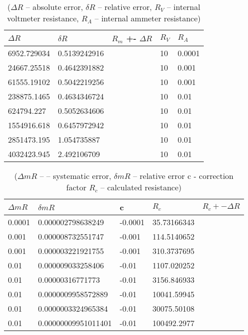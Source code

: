 \begin{table}[!ht]
    \centering
    \begin{tabular}{|l|l|l|l|l|}
    \hline
        $\Delta R$ & $\delta R$ & $R_m$ +- $\Delta R$ & $R_V$ & $R_A$ \\ \hline
        6952.729034 & 0.5139242916 & ~ & 10 & 0.0001 \\ \hline
        24667.25518 & 0.4642391882 & ~ & 10 & 0.001 \\ \hline
        61555.19102 & 0.5042219256 & ~ & 10 & 0.001 \\ \hline
        238875.1465 & 0.4634346724 & ~ & 10 & 0.01 \\ \hline
        624794.227 & 0.5052634606 & ~ & 10 & 0.01 \\ \hline
        1554916.618 & 0.6457972942 & ~ & 10 & 0.01 \\ \hline
        2851473.195 & 1.054735887 & ~ & 10 & 0.01 \\ \hline
        4032423.945 & 2.492106709 & ~ & 10 & 0.01 \\ \hline
    \end{tabular}
    \caption{($\Delta R$ -- absolute error, $\delta R$ -- relative error, $R_V$ -- internal voltmeter resistance, $R_A$ -- internal ammeter resistance)}
\end{table}

\begin{table}[!ht]
    \centering
    \begin{tabular}{|l|l|l|l|l|}
    \hline
        $\Delta mR$ & $\delta mR$ & c & $R_c$ & $R_c+- \Delta R$ \\ \hline
        0.0001 & 0.000002798638249 & -0.0001 & 35.73166343 & ~ \\ \hline
        0.001 & 0.000008732551747 & -0.001 & 114.5140652 & ~ \\ \hline
        0.001 & 0.000003221921755 & -0.001 & 310.3737695 & ~ \\ \hline
        0.01 & 0.000009033258406 & -0.01 & 1107.020252 & ~ \\ \hline
        0.01 & 0.00000316771773 & -0.01 & 3156.846933 & ~ \\ \hline
        0.01 & 0.0000009958572889 & -0.01 & 10041.59945 & ~ \\ \hline
        0.01 & 0.0000003324965384 & -0.01 & 30075.50108 & ~ \\ \hline
        0.01 & 0.00000009951011401 & -0.01 & 100492.2977 & ~  \\ \hline
    \end{tabular}
    \caption{($\Delta mR$ -- – systematic error, $\delta mR$ -- relative error  c - correction factor  $R_c$ -- calculated resistance)}

\end{table}

